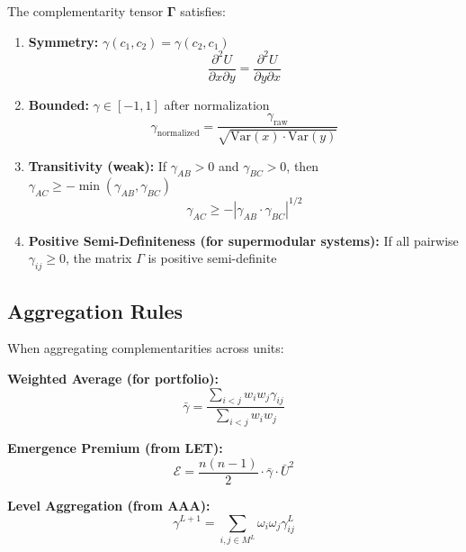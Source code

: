 \begin{theorem}
The complementarity tensor $\boldsymbol{\Gamma}$ satisfies:

\begin{enumerate}
    \item \textbf{Symmetry:} $\gamma(c_1, c_2) = \gamma(c_2, c_1)$
    \begin{equation}
    \frac{\partial^2 U}{\partial x \partial y} = \frac{\partial^2 U}{\partial y \partial x}
    \end{equation}

    \item \textbf{Bounded:} $\gamma \in [-1, 1]$ after normalization
    \begin{equation}
    \gamma_{\text{normalized}} = \frac{\gamma_{\text{raw}}}{\sqrt{\text{Var}(x) \cdot \text{Var}(y)}}
    \end{equation}

    \item \textbf{Transitivity (weak):} If $\gamma_{AB} > 0$ and $\gamma_{BC} > 0$,
    then $\gamma_{AC} \geq -\min(\gamma_{AB}, \gamma_{BC})$
    \begin{equation}
    \gamma_{AC} \geq -|\gamma_{AB} \cdot \gamma_{BC}|^{1/2}
    \end{equation}

    \item \textbf{Positive Semi-Definiteness (for supermodular systems):}
    If all pairwise $\gamma_{ij} \geq 0$, the matrix $\Gamma$ is positive semi-definite
\end{enumerate}
\end{theorem}

\subsection{Aggregation Rules}

\begin{theorem}
When aggregating complementarities across units:

\textbf{Weighted Average (for portfolio):}
\begin{equation}
\bar{\gamma} = \frac{\sum_{i<j} w_i w_j \gamma_{ij}}{\sum_{i<j} w_i w_j}
\end{equation}

\textbf{Emergence Premium (from LET):}
\begin{equation}
\mathcal{E} = \frac{n(n-1)}{2} \cdot \bar{\gamma} \cdot \bar{U}^2
\end{equation}

\textbf{Level Aggregation (from AAA):}
\begin{equation}
\gamma^{L+1} = \sum_{i,j \in M^L} \omega_i \omega_j \gamma^L_{ij}
\end{equation}
\end{theorem}

